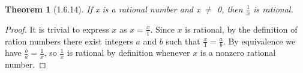 \documentclass[a4paper, 12pt]{article}
\theoremstyle{plain}
\newtheorem*{theorem*}{Theorem}
\begin{document}
	
	\begin{theorem*}[1.6.14]
		If x is a rational number and x $\neq$ 0, then $\frac{1}{x}$ is rational.
	\end{theorem*}
	
	\begin{proof}
		It is trivial to express $x$ as $x = \frac{x}{1}$. Since $x$ is rational, by the definition of ration numbers there exist integers $a$ and $b$ such that $\frac{x}{1} = \frac{a}{b}$. By equivalence we have $\frac{b}{a} = \frac{1}{x}$, so $\frac{1}{x}$ is rational by definition whenever $x$ is a nonzero rational number.
	\end{proof}
\end{document}
